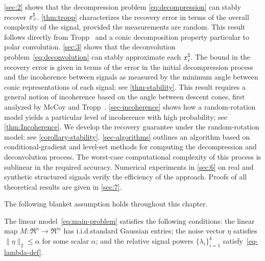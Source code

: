 \autoref{sec:2} shows that the decompression problem \eqref{eq:decompression} can stably recover $x_{\scriptscriptstyle S}^{\natural}$. \autoref{thm:tropp} characterizes the recovery error in terms of the overall complexity of the signal, provided the measurements are random. This result follows directly from Tropp~\cite{tropp2015convex} and a conic decomposition property particular to polar convolution. \autoref{sec:3} shows that the deconvolution problem~\eqref{eq:deconvolution} can stably approximate each $x_i^{\natural}$. The bound in the recovery error is given in terms of the error in the initial decompression process and the incoherence between signals as measured by the minimum angle between conic representations of each signal; see \autoref{thm-stability}. This result requires a general notion of incoherence based on the angle between descent cones, first analyzed by McCoy and Tropp~\cite{mccoy2013achievable}.  \autoref{sec-incoherence} shows how a random-rotation model yields a particular level of incoherence with high probability; see \autoref{thm:Incoherence}. We develop the recovery guarantee under the random-rotation model; see \autoref{corollary-stability}.  \autoref{sec-algorithms} outlines an algorithm based on conditional-gradient and level-set methods for computing the decompression and deconvolution process. The worst-case computational complexity of this process is sublinear in the required accuracy. Numerical experiments in \autoref{sec:6} on real and synthetic structured signals verify the efficiency of the approach. Proofs of all theoretical results are given in \autoref{sec:7}.

The following blanket assumption holds throughout this chapter.
\begin{assumption}\label{assume-blanket}
  The linear model~\eqref{eq:main-problem} satisfies the following conditions: the linear map
  $M:\Re^n\to\Re^m$ has i.i.d.\@ standard Gaussian entries; the noise vector $\eta$ satisfies $\|\eta\|_2\leq \alpha$ for some scalar $\alpha$; and the relative signal powers $\{\lambda_i\}_{i=1}^k$ satisfy~\eqref{eq-lambda-def}.
\end{assumption} 

